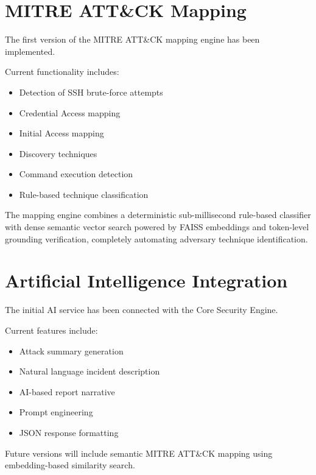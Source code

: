 \documentclass[12pt,a4paper]{report}
\begin{document}

\section{MITRE ATT\&CK Mapping}

The first version of the MITRE ATT\&CK mapping engine has been implemented.

Current functionality includes:

\begin{itemize}
\item Detection of SSH brute-force attempts
\item Credential Access mapping
\item Initial Access mapping
\item Discovery techniques
\item Command execution detection
\item Rule-based technique classification
\end{itemize}

The mapping engine combines a deterministic sub-millisecond rule-based classifier with dense semantic vector search powered by FAISS embeddings and token-level grounding verification, completely automating adversary technique identification.


\section{Artificial Intelligence Integration}

The initial AI service has been connected with the Core Security Engine.

Current features include:

\begin{itemize}
\item Attack summary generation
\item Natural language incident description
\item AI-based report narrative
\item Prompt engineering
\item JSON response formatting
\end{itemize}

Future versions will include semantic MITRE ATT\&CK mapping using embedding-based similarity search.

\end{document}
